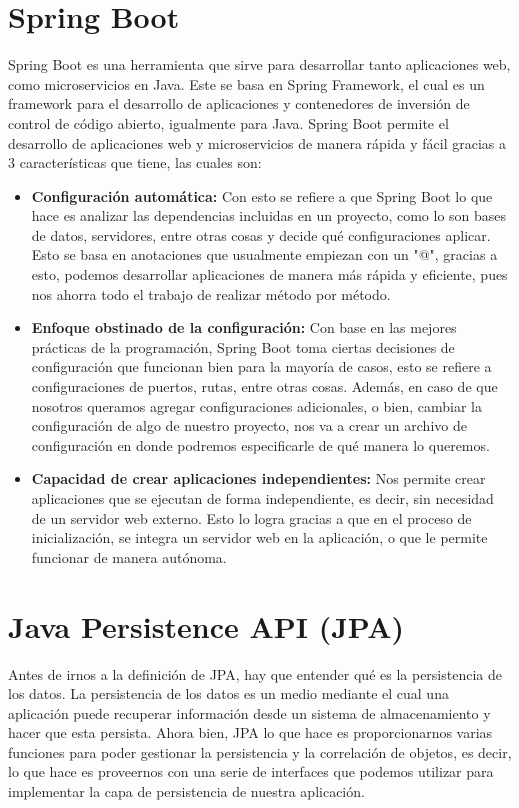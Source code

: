 
\section{Spring Boot}
Spring Boot es una herramienta que sirve para desarrollar tanto aplicaciones web, como microservicios en Java. Este se basa en Spring Framework, el cual es un framework para el desarrollo de aplicaciones y contenedores de inversión de control de código abierto, igualmente para Java.
Spring Boot permite el desarrollo de aplicaciones web y microservicios de manera rápida y fácil gracias a 3 características que tiene, las cuales son:
\begin{itemize}
    \item \textbf{Configuración automática:} Con esto se refiere a que Spring Boot lo que hace es analizar las dependencias incluidas en un proyecto, como lo son bases de datos, servidores, entre otras cosas y decide qué configuraciones aplicar. Esto se basa en anotaciones que usualmente empiezan con un "@", gracias a esto, podemos desarrollar aplicaciones de manera más rápida y eficiente, pues nos ahorra todo el trabajo de realizar método por método. \cite{CitaAJ01}
    \item \textbf{Enfoque obstinado de la configuración:} Con base en las mejores prácticas de la programación, Spring Boot toma ciertas decisiones de configuración que funcionan bien para la mayoría de casos, esto se refiere a configuraciones de puertos, rutas, entre otras cosas. Además, en caso de que nosotros queramos agregar configuraciones adicionales, o bien, cambiar la configuración de algo de nuestro proyecto, nos va a crear un archivo de configuración en donde podremos especificarle de qué manera lo queremos. \cite{CitaAJ02}
    \item \textbf{Capacidad de crear aplicaciones independientes:} Nos permite crear aplicaciones que se ejecutan de forma independiente, es decir, sin necesidad de un servidor web externo. Esto lo logra gracias a que en el proceso de inicialización, se integra un servidor web en la aplicación, o que le permite funcionar de manera autónoma. \cite{CitaAJ01}
\end{itemize}

\section{Java Persistence API (JPA)}
Antes de irnos a la definición de JPA, hay que entender qué es la persistencia de los datos. La persistencia de los datos es un medio mediante el cual una aplicación puede recuperar información desde un sistema de almacenamiento y hacer que esta persista. Ahora bien, JPA lo que hace es proporcionarnos varias funciones para poder gestionar la persistencia y la correlación de objetos, es decir, lo que hace es proveernos con una serie de interfaces que podemos utilizar para implementar la capa de persistencia de nuestra aplicación. \cite{CitaAJ03}

